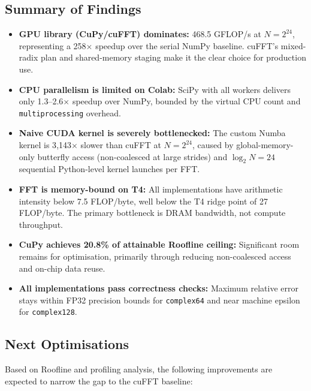 \documentclass[12pt, letterpaper]{article}
\begin{document}
\subsection{Summary of Findings}

\begin{itemize}
    \item \textbf{GPU library (CuPy/cuFFT) dominates:} 468.5 GFLOP/s at $N = 2^{24}$, representing a 258$\times$ speedup over the serial NumPy baseline. cuFFT's mixed-radix plan and shared-memory staging make it the clear choice for production use.
    \item \textbf{CPU parallelism is limited on Colab:} SciPy with all workers delivers only 1.3--2.6$\times$ speedup over NumPy, bounded by the virtual CPU count and \texttt{multiprocessing} overhead.
    \item \textbf{Naive CUDA kernel is severely bottlenecked:} The custom Numba kernel is 3{,}143$\times$ slower than cuFFT at $N = 2^{24}$, caused by global-memory-only butterfly access (non-coalesced at large strides) and $\log_2 N = 24$ sequential Python-level kernel launches per FFT.
    \item \textbf{FFT is memory-bound on T4:} All implementations have arithmetic intensity below 7.5 FLOP/byte, well below the T4 ridge point of 27 FLOP/byte. The primary bottleneck is DRAM bandwidth, not compute throughput.
    \item \textbf{CuPy achieves 20.8\% of attainable Roofline ceiling:} Significant room remains for optimisation, primarily through reducing non-coalesced access and on-chip data reuse.
    \item \textbf{All implementations pass correctness checks:} Maximum relative error stays within FP32 precision bounds for \texttt{complex64} and near machine epsilon for \texttt{complex128}.
\end{itemize}

\subsection{Next Optimisations}

Based on Roofline and profiling analysis, the following improvements are expected to narrow the gap to the cuFFT baseline:
\end{document}
